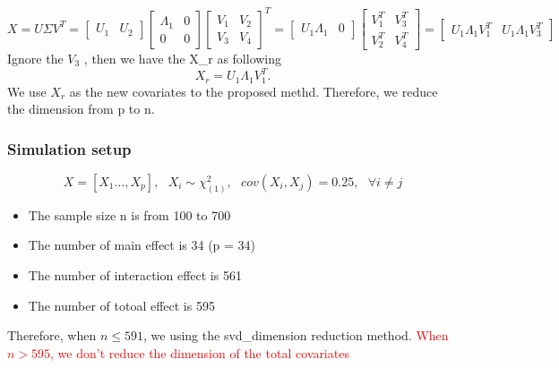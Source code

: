 \documentclass[]{article}
\providecommand{\tightlist}{%
  \setlength{\itemsep}{0pt}\setlength{\parskip}{0pt}}
\begin{document}
\[
  X = U \Sigma V^T = \begin{bmatrix}
                      U_1 & U_2
                      \end{bmatrix}
                      \begin{bmatrix}
                      \Lambda_1 & 0\\
                      0 & 0
                      \end{bmatrix}
                      \begin{bmatrix}
                      V_1 & V_2\\
                      V_3 & V_4
                      \end{bmatrix}^T 
                      = 
                      \begin{bmatrix}
                      U_1\Lambda_1 & 0
                      \end{bmatrix}
                      \begin{bmatrix}
                      V_1^T & V_3^T\\
                      V_2^T & V_4^T
                      \end{bmatrix}
                      =
                      \begin{bmatrix}
                      U_1\Lambda_1V_1^T & U_1\Lambda_1V_3^T
                      \end{bmatrix}
\] Ignore the \(V_3\) , then we have the X\_r as following \[
  X_r = U_1\Lambda_1V_1^T.
\] We use \(X_r\) as the new covariates to the proposed methd.
Therefore, we reduce the dimension from p to n.

\subsubsection{Simulation setup}\label{simulation-setup}

\[
  X = [X_1 \dots, X_p] ,~~~ X_i \sim \chi_{(1)}^2, ~~~ cov(X_i, X_j) = 0.25,~~~ \forall  i \ne j 
\]

\begin{itemize}
\tightlist
\item
  The sample size n is from 100 to 700
\item
  The number of main effect is 34 (p = 34)
\item
  The number of interaction effect is 561
\item
  The number of totoal effect is 595
\end{itemize}

Therefore, when \(n\leq591\), we using the svd\_dimension reduction
method.
\textcolor{red}{When $n > 595$, we don't reduce the dimension of the total covariates}
\end{document}
